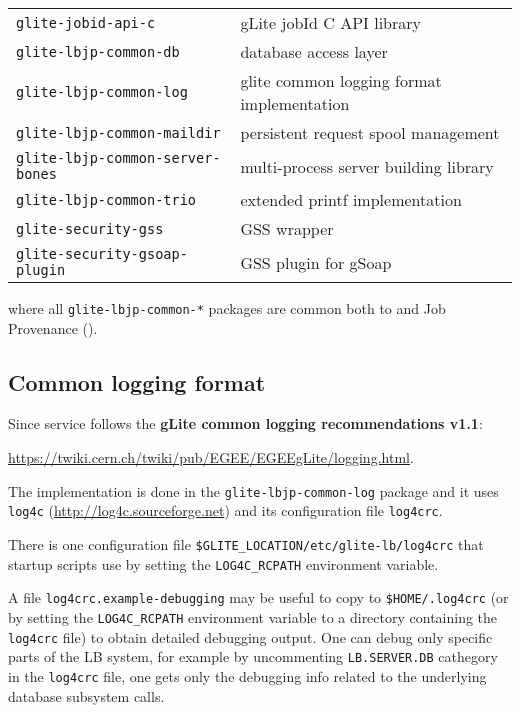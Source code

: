 \begin{tabularx}{\textwidth}{>{\tt}lX}
glite-jobid-api-c & gLite jobId C API library \\ 
glite-lbjp-common-db & database access layer \\
glite-lbjp-common-log & glite common logging format implementation \\
glite-lbjp-common-maildir & persistent request spool management \\
glite-lbjp-common-server-bones & multi-process server building library \\
glite-lbjp-common-trio & extended printf implementation \\
glite-security-gss & GSS wrapper \\
glite-security-gsoap-plugin & GSS plugin for gSoap \\
\end{tabularx}

where all \verb'glite-lbjp-common-*' packages are common both to \LB and 
Job Provenance (\JP).

\subsection{Common logging format}
Since  \LB service follows the \textbf{gLite common logging recommendations v1.1}:
\begin{center}
\url{https://twiki.cern.ch/twiki/pub/EGEE/EGEEgLite/logging.html}. 
\end{center}

The implementation is done in the \texttt{glite-lbjp-common-log} package and it 
uses \texttt{log4c} (\url{http://log4c.sourceforge.net})
and its configuration file \texttt{log4crc}. 

There is one configuration file \texttt{\$GLITE\_LOCATION/etc/glite-lb/log4crc}
that startup scripts use by setting the \texttt{LOG4C\_RCPATH} environment
variable.

A file \texttt{log4crc.example-debugging} may be useful to copy to
\texttt{\$HOME/.log4crc} (or by setting the \texttt{LOG4C\_RCPATH} environment variable
to a directory containing the \texttt{log4crc} file) to obtain detailed debugging output.
One can debug only specific parts of the LB system, for example
by uncommenting \texttt{LB.SERVER.DB} cathegory in the \texttt{log4crc} file,
one gets only the debugging info related to the underlying database subsystem calls.


